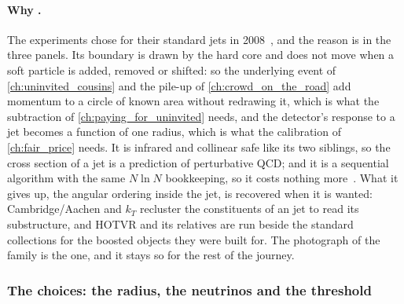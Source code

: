\paragraph{Why \antikt.} The experiments chose \antikt for their
standard jets in 2008~\cite{Cacciari:2008gp}, and the reason is in the
three panels. Its boundary is drawn by the hard core and does not move
when a soft particle is added, removed or shifted: so the underlying
event of \cref{ch:uninvited_cousins} and the pile-up of
\cref{ch:crowd_on_the_road} add momentum to a circle of known area
without redrawing it, which is what the subtraction of
\cref{ch:paying_for_uninvited} needs, and the detector's response to a
jet becomes a function of one radius, which is what the calibration of
\cref{ch:fair_price} needs. It is infrared and collinear safe like its two
siblings, so the cross section of a jet is a prediction of perturbative
QCD; and it is a sequential algorithm with the same $N\ln N$ bookkeeping,
so it costs nothing more~\cite{Cacciari:2011ma,Salam:2009jx}. What it
gives up, the angular ordering inside the jet, is recovered when it is
wanted: Cambridge/Aachen and $k_T$ recluster the constituents of an
\antikt jet to read its substructure, and HOTVR and its relatives are run
beside the standard collections for the boosted objects they were built
for. The photograph of the family is the \antikt one, and it stays so for
the rest of the journey.

\subsubsection{The choices: the radius, the neutrinos and the threshold}
\label{sec:family_photograph:choices}

